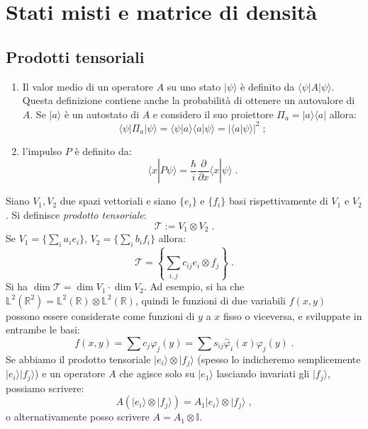 \documentclass[12pt,a4paper]{report}
\theoremstyle{definition}
\numberwithin{equation}{section}
\newcommand{\bra}{\langle}
\newcommand{\ket}{\rangle}
\begin{document}
\chapter{Stati misti e matrice di densità}
\section{Prodotti tensoriali}
\begin{enumerate}
\item Il valor medio di un operatore $A$ su uno stato $|\psi\ket$ è definito da $\bra\psi|A|\psi\ket$. Questa definizione contiene anche la probabilità di ottenere un autovalore di $A$. Se $|a\ket$ è un autostato di $A$ e considero il suo proiettore $\Pi_a=|a\ket\bra a|$ allora:
\begin{equation}
\bra\psi|\Pi_a|\psi\ket=\bra\psi|a\ket\bra a|\psi\ket=|\bra a|\psi\ket|^2\;;
\end{equation}
\item l'impulso $P$ è definito da:
\begin{equation}
\bra x|P\psi\ket=\frac{\hbar}{i}\frac{\partial}{\partial x}\bra x|\psi\ket\;.
\end{equation}
\end{enumerate}
Siano $V_1,V_2$ due spazi vettoriali e siano $\{e_i\}$ e $\{f_i\}$ basi rispettivamente di $V_1$ e $V_2$. Si definisce \textit{prodotto tensoriale}:
\begin{equation}
\mathcal{T}:=V_1\otimes V_2\;.
\end{equation}
Se $V_1=\{\sum_i a_ie_i\}$, $V_2=\{\sum_i b_if_i\}$ allora:
\begin{equation}
\mathcal{T}=\left\{ \sum_{i,j} c_{ij}e_i\otimes f_j\right\}\;.
\end{equation}
Si ha $\dim\mathcal{T}=\dim V_1\cdot\dim V_2$. Ad esempio, si ha che $\mathbb{L}^2(\mathbb{R}^2)=\mathbb{L}^2(\mathbb{R})\otimes \mathbb{L}^2(\mathbb{R})$, quindi le funzioni di due variabili $f(x,y)$ possono essere considerate come funzioni di $y$ a $x$ fisso o viceversa, e sviluppate in entrambe le basi:
\begin{equation}
f(x,y)=\sum c_j\varphi_j(y)=\sum s_{ij}\stackrel{\sim}{\varphi}_i(x)\varphi_j(y)\;.
\end{equation}
Se abbiamo il prodotto tensoriale $|e_i\ket\otimes |f_j\ket$ (spesso lo indicheremo semplicemente $|e_i\ket|f_j\ket$) e un operatore $A$ che agisce solo su $|e_1\ket$ lasciando invariati gli $|f_j\ket$, possiamo scrivere:
\begin{equation}
A\left(|e_i\ket\otimes|f_j\ket\right)=A_1|e_i\ket\otimes|f_j\ket\;,
\end{equation}
o alternativamente posso scrivere $A=A_1\otimes\mathbb{I}$.
\end{document}
